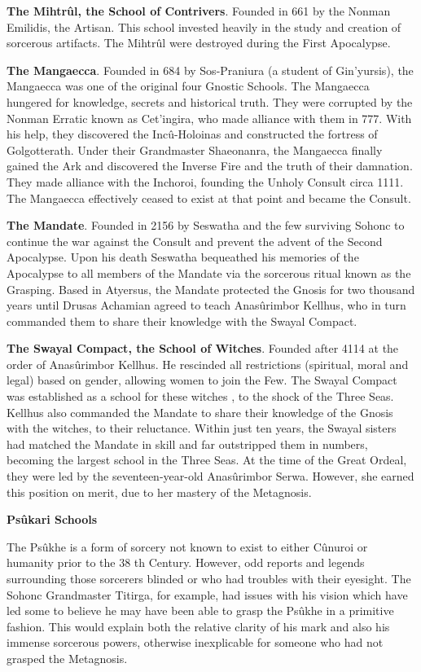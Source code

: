 \documentclass[]{book}
\begin{document}
\textbf{The Mihtrûl, the School of Contrivers}. Founded in 661 by the Nonman Emilidis, the
Artisan. This school invested heavily in the study and creation of sorcerous artifacts.
The Mihtrûl were destroyed during the First Apocalypse.

\textbf{The Mangaecca}. Founded in 684 by Sos-Praniura (a student of Gin'yursis), the
Mangaecca was one of the original four Gnostic Schools. The Mangaecca hungered for
knowledge, secrets and historical truth. They were corrupted by the Nonman Erratic
known as Cet'ingira, who made alliance with them in 777. With his help, they
discovered the Incû-Holoinas and constructed the fortress of Golgotterath. Under their
Grandmaster Shaeonanra, the Mangaecca finally gained the Ark and discovered the
Inverse Fire and the truth of their damnation. They made alliance with the Inchoroi,
founding the Unholy Consult circa 1111. The Mangaecca effectively ceased to exist at
that point and became the Consult.

\textbf{The Mandate}. Founded in 2156 by Seswatha and the few surviving Sohonc to continue
the war against the Consult and prevent the advent of the Second Apocalypse. Upon
his death Seswatha bequeathed his memories of the Apocalypse to all members of the
Mandate via the sorcerous ritual known as the Grasping. Based in Atyersus, the
Mandate protected the Gnosis for two thousand years until Drusas Achamian agreed to
teach Anasûrimbor Kellhus, who in turn commanded them to share their knowledge
with the Swayal Compact.

\textbf{The Swayal Compact, the School of Witches}. Founded after 4114 at the order of
Anasûrimbor Kellhus. He rescinded all restrictions (spiritual, moral and legal) based on
gender, allowing women to join the Few. The Swayal Compact was established as a
school for these witches , to the shock of the Three Seas. Kellhus also commanded the
Mandate to share their knowledge of the Gnosis with the witches, to their reluctance.
Within just ten years, the Swayal sisters had matched the Mandate in skill and far
outstripped them in numbers, becoming the largest school in the Three Seas. At the
time of the Great Ordeal, they were led by the seventeen-year-old Anasûrimbor Serwa.
However, she earned this position on merit, due to her mastery of the Metagnosis.

\textbf{Psûkari Schools}

The Psûkhe is a form of sorcery not known to exist to either Cûnuroi or humanity
prior to the 38 th Century. However, odd reports and legends surrounding those
sorcerers blinded or who had troubles with their eyesight. The Sohonc Grandmaster
Titirga, for example, had issues with his vision which have led some to believe he may
have been able to grasp the Psûkhe in a primitive fashion. This would explain both the
relative clarity of his mark and also his immense sorcerous powers, otherwise
inexplicable for someone who had not grasped the Metagnosis.
\end{document}
